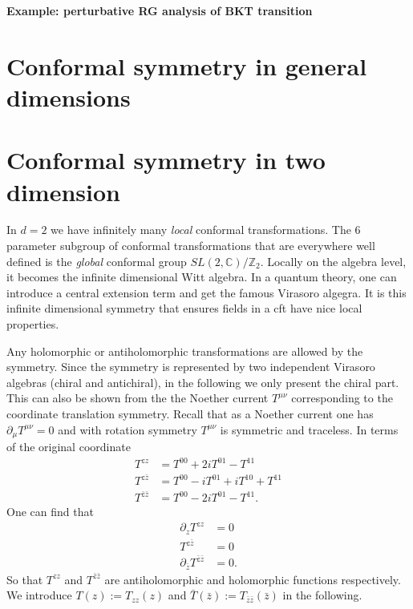 \documentclass[submission, PhysLectNotes]{SciPost}
\begin{document}
{\bf Example: perturbative RG analysis of BKT transition}

\section{Conformal symmetry in general dimensions}

\section{Conformal symmetry in two dimension}
In $d=2$ we have infinitely many \emph{local} conformal transformations. The 6 parameter subgroup of conformal transformations that are everywhere well defined is the \emph{global} conformal group $SL(2,\mathbb{C})/\mathbb{Z}_2$. Locally on the algebra level, it becomes the infinite dimensional Witt algebra. In a quantum theory, one can introduce a central extension term and get the famous Virasoro algegra. It is this infinite dimensional symmetry that ensures fields in a cft have nice local properties.

Any holomorphic or antiholomorphic transformations are allowed by the symmetry. Since the symmetry is represented by two independent Virasoro algebras (chiral and antichiral), in the following we only present the chiral part. This can also be shown from the the Noether current $T^{\mu\nu}$ corresponding to the coordinate translation symmetry. Recall that as a Noether current one has $\partial_\mu T^{\mu\nu} = 0$ and with rotation symmetry $T^{\mu\nu}$ is symmetric and traceless. In terms of the original coordinate
\begin{equation}
	\begin{aligned}
		T^{zz} &= T^{00} + 2iT^{01} - T^{11} \\
		T^{z\bar{z}} &= T^{00} - iT^{01} + iT^{10} + T^{11} \\
		T^{\bar{z}\bar{z}} &= T^{00} - 2iT^{01} - T^{11}.
	\end{aligned}
\end{equation}
One can find that 
\begin{equation}
	\begin{aligned}
		\partial_z T^{zz} &= 0 \\
		T^{z\bar{z}} &= 0 \\
		\partial_{\bar{z}} T^{\bar{z}\bar{z}} &= 0.
	\end{aligned}
\end{equation}
So that $T^{zz}$ and $T^{\bar{z}\bar{z}}$ are antiholomorphic and holomorphic functions respectively. We introduce $T(z) := T_{zz}(z)$ and $\bar{T}(\bar{z}) := T_{\bar{z}\bar{z}}(\bar{z})$ in the following. 
\end{document}
